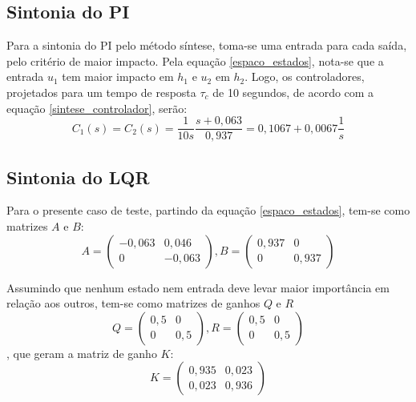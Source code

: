 \subsection{Sintonia do PI}

Para a sintonia do PI pelo método síntese, toma-se uma entrada para cada saída, pelo critério de maior impacto. Pela equação \ref{espaco_estados}, nota-se que a entrada $u_1$ tem maior impacto em $h_1$ e $u_2$ em $h_2$. Logo, os controladores, projetados para um tempo de resposta $\tau_c$ de 10 segundos, de acordo com a equação \ref{sintese_controlador}, serão:
\begin{equation}
C_1(s) = C_2(s) = \frac{1}{10s} \frac{s + 0,063}{0,937} = 0,1067 + 0,0067 \frac{1}{s}
\end{equation}

\subsection{Sintonia do LQR}

Para o presente caso de teste, partindo da equação \ref{espaco_estados}, tem-se como matrizes $A$ e $B$:
\begin{equation}
A = \begin{pmatrix} -0,063 & 0,046 \\ 0 & -0,063 \end{pmatrix},
B = \begin{pmatrix} 0,937 & 0 \\ 0 & 0,937 \end{pmatrix}
\end{equation}

Assumindo que nenhum estado nem entrada deve levar maior importância em relação aos outros, tem-se como matrizes de ganhos $Q$ e $R$
\begin{equation}
Q = \begin{pmatrix} 0,5 & 0 \\ 0 & 0,5 \end{pmatrix},
R = \begin{pmatrix} 0,5 & 0 \\ 0 & 0,5 \end{pmatrix}
\end{equation}
, que geram a matriz de ganho $K$:
\begin{equation}
K = \begin{pmatrix} 0,935 & 0,023 \\ 0,023 & 0,936 \end{pmatrix}
\end{equation}

